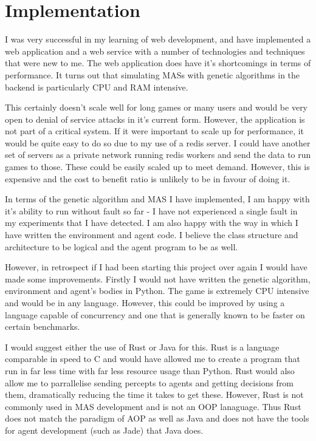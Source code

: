 \documentclass[]{final_report}
\begin{document}
\section{Implementation}
I was very successful in my learning of web development, and have implemented a web application and a web service with a number of technologies and techniques that were new to me. The web application does have it's shortcomings in terms of performance. It turns out that simulating MASs with genetic algorithms in the backend is particularly CPU and RAM intensive.\par 
This certainly doesn't scale well for long games or many users and would be very open to denial of service attacks in it's current form. However, the application is not part of a critical system. If it were important to scale up for performance, it would be quite easy to do so due to my use of a redis server. I could have another set of servers as a private network running redis workers and send the data to run games to those. These could be easily scaled up to meet demand. However, this is expensive and the cost to benefit ratio is unlikely to be in favour of doing it.\par
In terms of the genetic algorithm and MAS I have implemented, I am happy with it's ability to run without fault so far - I have not experienced a single fault in my experiments that I have detected. I am also happy with the way in which I have written the environment and agent code. I believe the class structure and architecture to be logical and the agent program to be as well.\par
However, in retrospect if I had been starting this project over again I would have made some improvements. Firstly I would not have written the genetic algorithm, environment and agent's bodies in Python. The game is extremely CPU intensive and would be in any language. However, this could be improved by using a language capable of concurrency and one that is generally known to be faster on certain benchmarks.\par 
I would suggest either the use of Rust or Java for this. Rust is a language comparable in speed to C and would have allowed me to create a program that run in far less time with far less resource usage than Python. Rust would also allow me to parrallelise sending percepts to agents and getting decisions from them, dramatically reducing the time it takes to get these. However, Rust is not commonly used in MAS development and is not an OOP lanaguage. Thus Rust does not match the paradigm of AOP as well as Java and does not have the tools for agent development (such as Jade) that Java does.\par 
\end{document}
